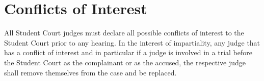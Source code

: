 \section{Conflicts of Interest}
All Student Court judges must declare all possible conflicts of interest to the Student Court prior to any hearing. In the interest of impartiality, any judge that has a conflict of interest and in particular if a judge is involved in a trial before the Student Court as the complainant or as the accused, the respective judge shall remove themselves from the case and be replaced.